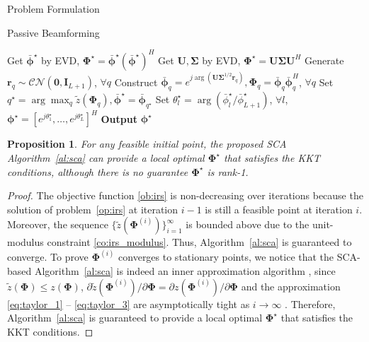 \documentclass[journal]{IEEEtran}
\newtheorem{proposition}{Proposition}
\begin{document}
\begin{section}{Problem Formulation}
\begin{subsection}{Passive Beamforming}
\begin{algorithm}[!t]
\begin{algorithmic}[1]
						\State Get $\bar{\boldsymbol{\phi}}^\star$ by EVD, $\boldsymbol{\Phi}^{\star}=\bar{\boldsymbol{\phi}}^\star(\bar{\boldsymbol{\phi}}^\star)^H$
					\Else
						\State Get $\boldsymbol{U},\boldsymbol{\Sigma}$ by EVD, $\boldsymbol{\Phi}^{\star}=\boldsymbol{U}\boldsymbol{\Sigma}\boldsymbol{U}^H$
						\State Generate $\boldsymbol{r}_q \sim \mathcal{CN}(\boldsymbol{0},\boldsymbol{I}_{L+1})$, $\forall q$
						\State Construct $\bar{\boldsymbol{\phi}}_q=e^{j\arg\left(\boldsymbol{U}\boldsymbol{\Sigma}^{1/2}\boldsymbol{r}_q\right)},\boldsymbol{\Phi}_q=\bar{\boldsymbol{\phi}}_q\bar{\boldsymbol{\phi}}_q^H$, $\forall q$
						\State Set $q^{\star}=\arg\max_q{\tilde{z}(\boldsymbol{\Phi}_q)},\bar{\boldsymbol{\phi}}^\star=\bar{\boldsymbol{\phi}}_{q^{\star}}$
					\EndIf
					\State Set $\theta_l^\star=\arg(\bar{\phi}_l^\star/\bar{\phi}_{L+1}^\star)$, $\forall l$, $\boldsymbol{\phi}^{\star}=[e^{j\theta_1^\star},\dots,e^{j\theta_L^\star}]^H$
					\State \textbf{Output} $\boldsymbol{\phi}^{\star}$
				\end{algorithmic}
			\end{algorithm}

			\begin{proposition}\label{pr:sca}
				For any feasible initial point, the proposed SCA Algorithm~\ref{al:sca} can provide a local optimal $\boldsymbol{\Phi}^{\star}$ that satisfies the KKT conditions, although there is no guarantee $\boldsymbol{\Phi}^{\star}$ is rank-\num{1}.
			\end{proposition}

			\begin{proof}\label{pf:sca}
				The objective function \eqref{ob:irs} is non-decreasing over iterations because the solution of problem~\eqref{op:irs} at iteration $i-1$ is still a feasible point at iteration $i$. Moreover, the sequence $\{\tilde{z}(\boldsymbol{\Phi}^{(i)})\}_{i=1}^{\infty}$ is bounded above due to the unit-modulus constraint \eqref{co:irs_modulus}. Thus, Algorithm~\ref{al:sca} is guaranteed to converge. To prove $\boldsymbol{\Phi}^{(i)}$ converges to stationary points, we notice that the SCA-based Algorithm~\ref{al:sca} is indeed an inner approximation algorithm \cite{Marks1978}, since $\tilde{z}(\boldsymbol{\Phi}) \le z(\boldsymbol{\Phi})$, $\partial\tilde{z}(\boldsymbol{\Phi}^{(i)})/\partial\boldsymbol{\Phi}=\partial z(\boldsymbol{\Phi}^{(i)})/\partial\boldsymbol{\Phi}$ and the approximation \eqref{eq:taylor_1} -- \eqref{eq:taylor_3} are asymptotically tight as $i \to \infty$ \cite{Li2013}. Therefore, Algorithm~\ref{al:sca} is guaranteed to provide a local optimal $\boldsymbol{\Phi}^{\star}$ that satisfies the KKT conditions.
			\end{proof}
		\end{subsection}


\end{section}
\end{document}
